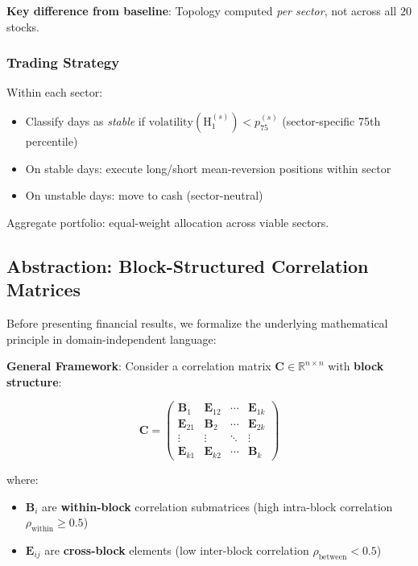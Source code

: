 \textbf{Key difference from baseline}: Topology computed \textit{per sector}, not across all 20 stocks.

\subsubsection{Trading Strategy}

Within each sector:
\begin{itemize}
    \item Classify days as \textit{stable} if $\text{volatility}(\text{H}_1^{(s)}) < p_{75}^{(s)}$ (sector-specific 75th percentile)
    \item On stable days: execute long/short mean-reversion positions within sector
    \item On unstable days: move to cash (sector-neutral)
\end{itemize}

Aggregate portfolio: equal-weight allocation across viable sectors.

\subsection{Abstraction: Block-Structured Correlation Matrices}
\label{sec:block-abstraction}

Before presenting financial results, we formalize the underlying mathematical principle in domain-independent language:

\textbf{General Framework}: Consider a correlation matrix $\mathbf{C} \in \mathbb{R}^{n \times n}$ with \textbf{block structure}:

\begin{equation}
\mathbf{C} =
\begin{pmatrix}
\mathbf{B}_1 & \mathbf{E}_{12} & \cdots & \mathbf{E}_{1k} \\
\mathbf{E}_{21} & \mathbf{B}_2 & \cdots & \mathbf{E}_{2k} \\
\vdots & \vdots & \ddots & \vdots \\
\mathbf{E}_{k1} & \mathbf{E}_{k2} & \cdots & \mathbf{B}_k
\end{pmatrix}
\end{equation}

where:
\begin{itemize}
\item $\mathbf{B}_i$ are \textbf{within-block} correlation submatrices (high intra-block correlation $\rho_{\text{within}} \geq 0.5$)
\item $\mathbf{E}_{ij}$ are \textbf{cross-block} elements (low inter-block correlation $\rho_{\text{between}} < 0.5$)
\end{itemize}

